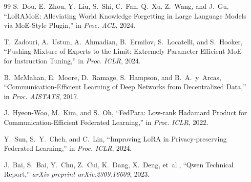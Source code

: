 \documentclass[conference, 10pt]{IEEEtran}
\begin{document}
\begin{thebibliography}{99}
S.~Dou, E.~Zhou, Y.~Liu, S.~Shi, C.~Fan, Q.~Xu, Z.~Wang, and J.~Gu,
``LoRAMoE: Alleviating World Knowledge Forgetting in Large Language Models
via MoE-Style Plugin,''
in \emph{Proc. ACL}, 2024.

T.~Zadouri, A.~Ustun, A.~Ahmadian, B.~Ermilov, S.~Locatelli, and S.~Hooker,
``Pushing Mixture of Experts to the Limit: Extremely Parameter Efficient MoE
for Instruction Tuning,''
in \emph{Proc. ICLR}, 2024.

B.~McMahan, E.~Moore, D.~Ramage, S.~Hampson, and B.~A.~y~Arcas,
``Communication-Efficient Learning of Deep Networks from Decentralized Data,''
in \emph{Proc. AISTATS}, 2017.

J.~Hyeon-Woo, M.~Kim, and S.~Oh,
``FedPara: Low-rank Hadamard Product for Communication-Efficient Federated
Learning,''
in \emph{Proc. ICLR}, 2022.

Y.~Sun, S.~Y.~Cheh, and C.~Lin,
``Improving LoRA in Privacy-preserving Federated Learning,''
in \emph{Proc. ICLR}, 2024.

J.~Bai, S.~Bai, Y.~Chu, Z.~Cui, K.~Dang, X.~Deng, et~al.,
``Qwen Technical Report,''
\emph{arXiv preprint arXiv:2309.16609}, 2023.

\end{thebibliography}
\end{document}
